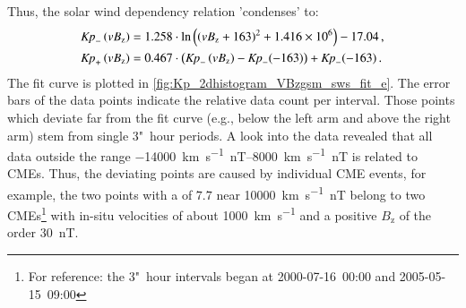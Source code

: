 Thus, the solar wind dependency relation 'condenses' to:
\begin{align}
	\text{\textit{Kp}}_-\left(vB_\text{z}\right) &= 1.258 \cdot \ln\left(\left(vB_\text{z} + 163\right)^2 + \num{1.416e6}\right) - 17.04	\,,	\label{eq:kpvsvbz_dependency_function_negative}\\
	\text{\textit{Kp}}_+\left(vB_\text{z}\right) &= 0.467 \cdot \left(\text{\textit{Kp}}_-\left(vB_\text{z}\right) - \text{\textit{Kp}}_-(-163)\right) + \text{\textit{Kp}}_-(-163)	\,.	\label{eq:kpvsvbz_dependency_function_positive}
\end{align}
The fit curve is plotted in \autoref{fig:Kp_2dhistogram_VBzgsm_sws_fit_e}. The error bars of the data points indicate the relative data count per \vBz{} interval. Those points which deviate far from the fit curve (e.g., below the left arm and above the right arm) stem from single 3"~hour periods. A look into the data revealed that all data outside the range \SIrange{-14000}{8000}{\km\per\s\nano\tesla} is related to CMEs. Thus, the deviating points are caused by individual CME events, for example, the two points with a \Kp{} of $7.7$ near \SI{10000}{\km\per\s\nano\tesla} belong to two CMEs\footnote{For reference: the 3"~hour intervals began at 2000-07-16~00:00 and 2005-05-15~09:00} with in-situ velocities of about \SI{1000}{\km\per\s} and a positive $B_\text{z}$ of the order \SI{30}{\nano\tesla}.
\begin{figure}[htb]
\end{figure}

